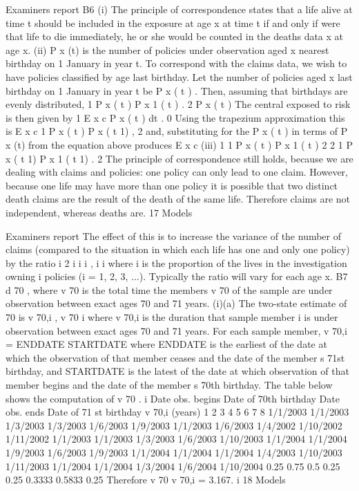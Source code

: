 \documentclass[a4paper,12pt]{article}
\begin{document}
\begin{enumerate}
Examiners report
B6 (i) The principle of correspondence states that a life alive at time t should be
included in the exposure at age x at time t if and only if were that life to die
immediately, he or she would be counted in the deaths data x at age x.
(ii) P x (t) is the number of policies under observation aged x nearest birthday on
1 January in year t.
To correspond with the claims data, we wish to have policies classified by age
last birthday.
Let the number of policies aged x last birthday on 1 January in year t be P x ( t ) .
Then, assuming that birthdays are evenly distributed,
1
P x ( t ) P x 1 ( t ) .
2
P x ( t )
The central exposed to risk is then given by
1
E x c
P x ( t ) dt .
0
Using the trapezium approximation this is
E x c
1
P x ( t ) P x ( t 1) ,
2
and, substituting for the P x ( t ) in terms of P x (t) from the equation above
produces
E x c
(iii)
1 1
P x ( t ) P x 1 ( t )
2 2
1
P x ( t 1) P x 1 ( t 1) .
2
The principle of correspondence still holds, because we are dealing with
claims and policies: one policy can only lead to one claim.
However, because one life may have more than one policy it is possible that
two distinct death claims are the result of the death of the same life.
Therefore claims are not independent, whereas deaths are.
17
Models

Examiners report
The effect of this is to increase the variance of the number of claims
(compared to the situation in which each life has one and only one policy) by
the ratio
i 2
i
i
i
,
i
i
where i is the proportion of the lives in the investigation owning i policies (i
= 1, 2, 3, ...).
Typically the ratio will vary for each age x.
B7
d 70
, where v 70 is the total time the members
v 70
of the sample are under observation between exact ages 70 and 71 years.
(i)(a) The two-state estimate of
70
is
v 70,i ,
v 70
i
where v 70,i is the duration that sample member i is under observation between
exact ages 70 and 71 years.
For each sample member, v 70,i = ENDDATE
STARTDATE
where ENDDATE is the earliest of the date at which the observation of that
member ceases and the date of the member s 71st birthday,
and STARTDATE is the latest of the date at which observation of that
member begins and the date of the member s 70th birthday.
The table below shows the computation of v 70 .
i Date
obs.
begins Date of
70th
birthday Date
obs.
ends Date of
71 st
birthday v 70,i
(years)
1
2
3
4
5
6
7
8 1/1/2003
1/1/2003
1/3/2003
1/3/2003
1/6/2003
1/9/2003
1/1/2003
1/6/2003 1/4/2002
1/10/2002
1/11/2002
1/1/2003
1/1/2003
1/3/2003
1/6/2003
1/10/2003 1/1/2004
1/1/2004
1/9/2003
1/6/2003
1/9/2003
1/1/2004
1/1/2004
1/1/2004 1/4/2003
1/10/2003
1/11/2003
1/1/2004
1/1/2004
1/3/2004
1/6/2004
1/10/2004 0.25
0.75
0.5
0.25
0.25
0.3333
0.5833
0.25
Therefore v 70
v 70,i = 3.167.
i
18
Models


\end{enumerate}
\end{document}

